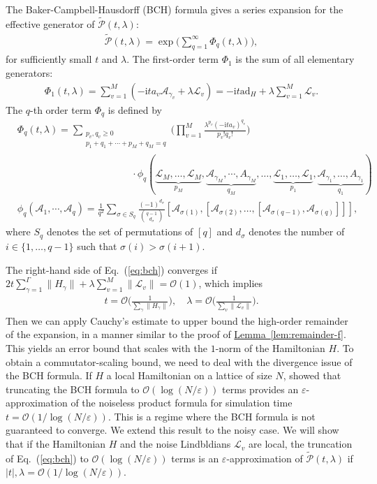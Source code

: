 \documentclass[11pt]{article}
\newcommand{\eq}[1]{(\ref{eq:#1})}
\newcommand{\lem}[1]{\hyperref[lem:#1]{Lemma~\ref*{lem:#1}}}
\renewcommand{\i}{\mathrm{i}}
\renewcommand{\L}{\mathcal{L}}
\newcommand{\ad}{\mathrm{ad}}
\newcommand{\B}{\Big}
\renewcommand{\P}{\mathcal{P}}
\newcommand{\A}{\mathcal{A}}
\renewcommand{\O}{\mathcal{O}}
\begin{document}
The Baker-Campbell-Hausdorff (BCH) formula gives a series expansion for the effective generator of $\tilde{\P}(t,\lambda)$:
\begin{align}
\label{eq:bch}
    \tilde{\P}(t,\lambda) = \exp\bigg( \sum_{q=1}^{\infty} \Phi_q(t, \lambda) \bigg),
\end{align}
for sufficiently small $t$ and $\lambda$. The first-order term $\Phi_1$ is the sum of all elementary generators:
\begin{align*}
    \Phi_1(t, \lambda) = \sum_{v=1}^M \left( -\i t a_v \A_{\gamma_v} + \lambda \L_v \right) = -\i t \ad_{H} + \lambda\sum_{v=1}^{M}\L_{v}.
\end{align*} 
The $q$-th order term $\Phi_q$ is defined by \begin{align}
    &\Phi_q(t,\lambda)=\sum_{\substack{p_v,q_v\ge 0\nonumber\\ p_1+q_1+\cdots+p_M+q_M=q }}\bigg(\prod_{v=1}^M \frac{\lambda^{p_v}(-\i ta_v)^{q_v}}{p_v!q_v!} \bigg)\\& \hspace{140pt}\cdot\phi_q(\underbrace{\L_M, \ldots, \L_M}_{p_M}, \underbrace{\A_{\gamma_M}, \cdots, A_{\gamma_M}}_{q_M},  \ldots, \underbrace{\L_1,  \ldots, \L_1}_{p_1}, \underbrace{\A_{\gamma_1},  \ldots, A_{\gamma_1}}_{q_1}) \label{eq:def-Phi-q} \\
    &\phi_q(\mathcal{A}_1, \cdots, \mathcal{A}_q)=\frac{1}{q^2} \sum_{\sigma \in S_q} \frac{(-1)^{d_\sigma}}{\binom{q-1}{d_\sigma}}\left[\mathcal{A}_{\sigma(1)},\left[\mathcal{A}_{\sigma(2)},  \ldots,\left[\mathcal{A}_{\sigma(q-1)}, \mathcal{A}_{\sigma(q)}\right]\right]\right], \nonumber
\end{align}
where $S_q$ denotes the set of permutations of $[q]$ and $d_{\sigma}$ denotes the number of $i\in\{1, \ldots, q-1\}$ such that $\sigma(i)>\sigma(i+1)$. 

The right-hand side of Eq.~\eq{bch} converges if $2t\sum_{\gamma=1}^{\Gamma}\|H_{\gamma}\|+\lambda\sum_{v=1}^{M}\|\L_v\|=\O (1)$, which implies \begin{align}
    \label{eq:bch-converge} 
    t = \O\B(\frac{1}{\sum_{\gamma}\|H_\gamma\|}\B), \quad \lambda = \O\B(\frac{1}{\sum_v\|\L_v\|}\B).
\end{align} 
Then we can apply Cauchy's estimate to upper bound the high-order remainder of the expansion, in a manner similar to the proof of \lem{remainder-f}. This yields an error bound that scales with the $1$-norm of the Hamiltonian $H$. To obtain a commutator-scaling bound, we need to deal with the divergence issue of the BCH formula. If $H$ a local Hamiltonian on a lattice of size $N$, \citet{mizuta2025commutator} showed that truncating the BCH formula to $\O(\log(N/\varepsilon))$ terms provides an $\varepsilon$-approximation of the noiseless product formula for simulation time $t=\O(1/\log(N/\varepsilon))$. This is a regime where the BCH formula is not guaranteed to converge. We extend this result to the noisy case. We will show that if the Hamiltonian $H$ and the noise Lindbldians $\L_v$ are local, the truncation of Eq.~\eq{bch} to $\O(\log(N/\varepsilon))$ terms is an $\varepsilon$-approximation of $\tilde{\P}(t,\lambda)$ if $|t|, \lambda =\O(1/\log(N/\varepsilon))$.
\end{document}
